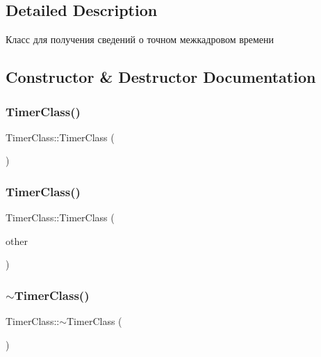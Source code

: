 \subsection{Detailed Description}
Класс для получения сведений о точном межкадровом времени 

\subsection{Constructor \& Destructor Documentation}
\mbox{\label{class_timer_class_a9ac295c3e61635d34c86abbb4c94869c}} 
\subsubsection{\texorpdfstring{Timer\+Class()}{TimerClass()}\hspace{0.1cm}{\footnotesize\ttfamily [1/2]}}
{\footnotesize\ttfamily Timer\+Class\+::\+Timer\+Class (\begin{DoxyParamCaption}{ }\end{DoxyParamCaption})}

\mbox{\label{class_timer_class_af0436af5e1123f941c833616003e8ec9}} 
\subsubsection{\texorpdfstring{Timer\+Class()}{TimerClass()}\hspace{0.1cm}{\footnotesize\ttfamily [2/2]}}
{\footnotesize\ttfamily Timer\+Class\+::\+Timer\+Class (\begin{DoxyParamCaption}\item[{const \hyperlink{class_timer_class}{Timer\+Class} \&}]{other }\end{DoxyParamCaption})}

\mbox{\label{class_timer_class_a408dda5491a2bec9385db139e90c4d2d}} 
\subsubsection{\texorpdfstring{$\sim$\+Timer\+Class()}{~TimerClass()}}
{\footnotesize\ttfamily Timer\+Class\+::$\sim$\+Timer\+Class (\begin{DoxyParamCaption}{ }\end{DoxyParamCaption})}



